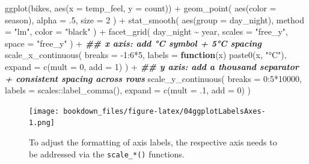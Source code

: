 \documentclass[
]{krantz}
\makeatletter
\newenvironment{Shaded}{\begin{snugshade}}{\end{snugshade}}
\newcommand{\AttributeTok}[1]{\textcolor[rgb]{0.61,0.61,0.61}{#1}}
\newcommand{\ControlFlowTok}[1]{\textcolor[rgb]{0.27,0.27,0.27}{\textbf{#1}}}
\newcommand{\DecValTok}[1]{\textcolor[rgb]{0.06,0.06,0.06}{#1}}
\newcommand{\DocumentationTok}[1]{\textcolor[rgb]{0.37,0.37,0.37}{\textbf{\textit{#1}}}}
\newcommand{\FunctionTok}[1]{\textcolor[rgb]{0,0,0}{#1}}
\newcommand{\NormalTok}[1]{#1}
\newcommand{\SpecialCharTok}[1]{\textcolor[rgb]{0,0,0}{#1}}
\newcommand{\StringTok}[1]{\textcolor[rgb]{0.5,0.5,0.5}{#1}}
\newenvironment{kframe}{%
\medskip{}
\setlength{\fboxsep}{.8em}
 \def\at@end@of@kframe{}%
 \ifinner\ifhmode%
  \def\at@end@of@kframe{\end{minipage}}%
  \begin{minipage}{\columnwidth}%
 \fi\fi%
 \def\FrameCommand##1{\hskip\@totalleftmargin \hskip-\fboxsep
 \colorbox{shadecolor}{##1}\hskip-\fboxsep
     \hskip-\linewidth \hskip-\@totalleftmargin \hskip\columnwidth}%
 \MakeFramed {\advance\hsize-\width
   \@totalleftmargin\z@ \linewidth\hsize
   \@setminipage}}%
 {\par\unskip\endMakeFramed%
 \at@end@of@kframe}
\renewenvironment{Shaded}{\begin{kframe}}{\end{kframe}}
\makeatother
\begin{document}
\begin{Shaded}
\begin{Highlighting}[]
\FunctionTok{ggplot}\NormalTok{(bikes, }\FunctionTok{aes}\NormalTok{(}\AttributeTok{x =}\NormalTok{ temp\_feel, }\AttributeTok{y =}\NormalTok{ count)) }\SpecialCharTok{+} 
  \FunctionTok{geom\_point}\NormalTok{(}
    \FunctionTok{aes}\NormalTok{(}\AttributeTok{color =}\NormalTok{ season), }\AttributeTok{alpha =}\NormalTok{ .}\DecValTok{5}\NormalTok{, }\AttributeTok{size =} \DecValTok{2}
\NormalTok{  ) }\SpecialCharTok{+} 
  \FunctionTok{stat\_smooth}\NormalTok{(}
    \FunctionTok{aes}\NormalTok{(}\AttributeTok{group =}\NormalTok{ day\_night), }\AttributeTok{method =} \StringTok{"lm"}\NormalTok{, }\AttributeTok{color =} \StringTok{"black"}
\NormalTok{  ) }\SpecialCharTok{+}
  \FunctionTok{facet\_grid}\NormalTok{(}
\NormalTok{    day\_night }\SpecialCharTok{\textasciitilde{}}\NormalTok{ year, }\AttributeTok{scales =} \StringTok{"free\_y"}\NormalTok{, }\AttributeTok{space =} \StringTok{"free\_y"}
\NormalTok{  ) }\SpecialCharTok{+}
  \DocumentationTok{\#\# x axis: add °C symbol + 5°C spacing}
  \FunctionTok{scale\_x\_continuous}\NormalTok{(}
    \AttributeTok{breaks =} \SpecialCharTok{{-}}\DecValTok{1}\SpecialCharTok{:}\DecValTok{6}\SpecialCharTok{*}\DecValTok{5}\NormalTok{, }\AttributeTok{labels =} \ControlFlowTok{function}\NormalTok{(x) }\FunctionTok{paste0}\NormalTok{(x, }\StringTok{"°C"}\NormalTok{), }\AttributeTok{expand =} \FunctionTok{c}\NormalTok{(}\AttributeTok{mult =} \DecValTok{0}\NormalTok{, }\AttributeTok{add =} \DecValTok{1}\NormalTok{)}
\NormalTok{  ) }\SpecialCharTok{+}
  \DocumentationTok{\#\# y axis: add a thousand separator + consistent spacing across rows}
  \FunctionTok{scale\_y\_continuous}\NormalTok{(}
    \AttributeTok{breaks =} \DecValTok{0}\SpecialCharTok{:}\DecValTok{5}\SpecialCharTok{*}\DecValTok{10000}\NormalTok{, }\AttributeTok{labels =}\NormalTok{ scales}\SpecialCharTok{::}\FunctionTok{label\_comma}\NormalTok{(), }\AttributeTok{expand =} \FunctionTok{c}\NormalTok{(}\AttributeTok{mult =}\NormalTok{ .}\DecValTok{1}\NormalTok{, }\AttributeTok{add =} \DecValTok{0}\NormalTok{)}
\NormalTok{  )}
\end{Highlighting}
\end{Shaded}

\begin{figure}
\centering
\texttt{[image: bookdown\_files/figure-latex/04ggplotLabelsAxes-1.png]}
\caption{\label{fig:04ggplotLabelsAxes}To adjust the formatting of axis labels, the respective axis needs to be addressed via the \texttt{scale\_*()} functions.}
\end{figure}
\end{document}
